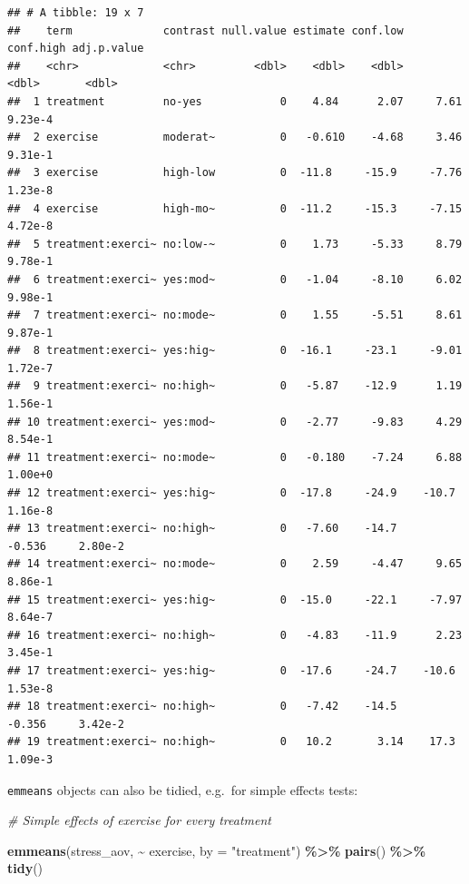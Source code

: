 \documentclass[
]{book}
\newenvironment{Shaded}{\begin{snugshade}}{\end{snugshade}}
\newcommand{\AttributeTok}[1]{\textcolor[rgb]{0.13,0.29,0.53}{#1}}
\newcommand{\CommentTok}[1]{\textcolor[rgb]{0.56,0.35,0.01}{\textit{#1}}}
\newcommand{\FunctionTok}[1]{\textcolor[rgb]{0.13,0.29,0.53}{\textbf{#1}}}
\newcommand{\NormalTok}[1]{#1}
\newcommand{\SpecialCharTok}[1]{\textcolor[rgb]{0.81,0.36,0.00}{\textbf{#1}}}
\newcommand{\StringTok}[1]{\textcolor[rgb]{0.31,0.60,0.02}{#1}}
\begin{document}
\begin{verbatim}
## # A tibble: 19 x 7
##    term              contrast null.value estimate conf.low conf.high adj.p.value
##    <chr>             <chr>         <dbl>    <dbl>    <dbl>     <dbl>       <dbl>
##  1 treatment         no-yes            0    4.84      2.07     7.61      9.23e-4
##  2 exercise          moderat~          0   -0.610    -4.68     3.46      9.31e-1
##  3 exercise          high-low          0  -11.8     -15.9     -7.76      1.23e-8
##  4 exercise          high-mo~          0  -11.2     -15.3     -7.15      4.72e-8
##  5 treatment:exerci~ no:low-~          0    1.73     -5.33     8.79      9.78e-1
##  6 treatment:exerci~ yes:mod~          0   -1.04     -8.10     6.02      9.98e-1
##  7 treatment:exerci~ no:mode~          0    1.55     -5.51     8.61      9.87e-1
##  8 treatment:exerci~ yes:hig~          0  -16.1     -23.1     -9.01      1.72e-7
##  9 treatment:exerci~ no:high~          0   -5.87    -12.9      1.19      1.56e-1
## 10 treatment:exerci~ yes:mod~          0   -2.77     -9.83     4.29      8.54e-1
## 11 treatment:exerci~ no:mode~          0   -0.180    -7.24     6.88      1.00e+0
## 12 treatment:exerci~ yes:hig~          0  -17.8     -24.9    -10.7       1.16e-8
## 13 treatment:exerci~ no:high~          0   -7.60    -14.7     -0.536     2.80e-2
## 14 treatment:exerci~ no:mode~          0    2.59     -4.47     9.65      8.86e-1
## 15 treatment:exerci~ yes:hig~          0  -15.0     -22.1     -7.97      8.64e-7
## 16 treatment:exerci~ no:high~          0   -4.83    -11.9      2.23      3.45e-1
## 17 treatment:exerci~ yes:hig~          0  -17.6     -24.7    -10.6       1.53e-8
## 18 treatment:exerci~ no:high~          0   -7.42    -14.5     -0.356     3.42e-2
## 19 treatment:exerci~ no:high~          0   10.2       3.14    17.3       1.09e-3
\end{verbatim}

\texttt{emmeans} objects can also be tidied, e.g.~for simple effects tests:

\begin{Shaded}
\begin{Highlighting}[]
\CommentTok{\# Simple effects of exercise for every treatment}

\FunctionTok{emmeans}\NormalTok{(stress\_aov, }\SpecialCharTok{\textasciitilde{}}\NormalTok{ exercise, }\AttributeTok{by =} \StringTok{"treatment"}\NormalTok{) }\SpecialCharTok{\%\textgreater{}\%}
  \FunctionTok{pairs}\NormalTok{() }\SpecialCharTok{\%\textgreater{}\%}
  \FunctionTok{tidy}\NormalTok{()}
\end{Highlighting}
\end{Shaded}
\end{document}
